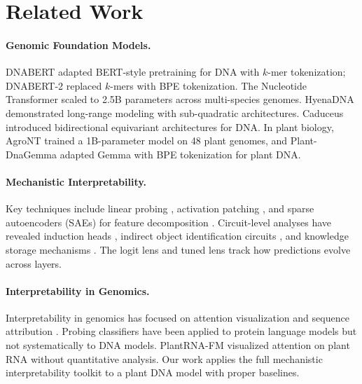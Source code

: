 \documentclass{article}
\begin{document}
\section{Related Work}

\paragraph{Genomic Foundation Models.}
DNABERT \citep{ji2021dnabert} adapted BERT-style pretraining for DNA with $k$-mer tokenization; DNABERT-2 \citep{zhou2023dnabert2} replaced $k$-mers with BPE tokenization. The Nucleotide Transformer \citep{dalla2023nucleotide} scaled to 2.5B parameters across multi-species genomes. HyenaDNA \citep{nguyen2024hyenadna} demonstrated long-range modeling with sub-quadratic architectures. Caduceus \citep{schiff2024caduceus} introduced bidirectional equivariant architectures for DNA. In plant biology, AgroNT \citep{mendoza2024agront} trained a 1B-parameter model on 48 plant genomes, and Plant-DnaGemma \citep{zhang2024plantdnagemma} adapted Gemma with BPE tokenization for plant DNA.

\paragraph{Mechanistic Interpretability.}
Key techniques include linear probing \citep{alain2017understanding, belinkov2017neural, hewitt2019structural}, activation patching \citep{vig2020investigating, meng2022locating}, and sparse autoencoders (SAEs) for feature decomposition \citep{cunningham2023sparse, bricken2023monosemanticity, templeton2024scaling}. Circuit-level analyses have revealed induction heads \citep{olsson2022context}, indirect object identification circuits \citep{wang2023interpretability}, and knowledge storage mechanisms \citep{geva2023dissecting}. The logit lens \citep{nostalgebraist2020logit} and tuned lens \citep{belrose2023eliciting} track how predictions evolve across layers.

\paragraph{Interpretability in Genomics.}
Interpretability in genomics has focused on attention visualization \citep{clauwaert2021explainability} and sequence attribution \citep{avsec2021effective}. Probing classifiers have been applied to protein language models \citep{vig2021bertology, rao2019evaluating, rives2021biological} but not systematically to DNA models. PlantRNA-FM \citep{yu2024plantrna} visualized attention on plant RNA without quantitative analysis. Our work applies the full mechanistic interpretability toolkit to a plant DNA model with proper baselines.
\end{document}
